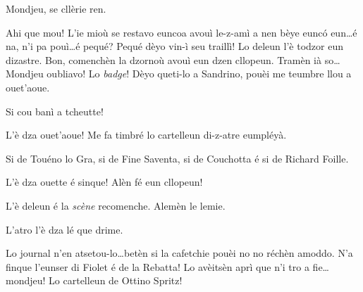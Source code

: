 \begin{drama}
\Spritzspeaks{} Mondjeu,  se cllèrie ren. 

\Spritzspeaks Ahi que mou! L’ie mioù se restavo euncoa avouì le-z-amì a nen bèye eunc\'o eun\ldots é na, n'i pa pouì\ldots é pequé? Pequé dèyo vin-ì seu traillì! Lo deleun l’è todzor eun dizastre. Bon, comenchèn la dzornoù avouì eun dzen cllopeun.  Tramèn ià so\ldots  Mondjeu oubliavo! Lo \textit{badge}! Dèyo queti-lo a Sandrino, pouèi me teumbre llou a ouet'aoue.


\Spritzspeaks Si cou banì a tcheutte!




\Thierryspeaks L'è dza ouet'aoue! Me fa timbré lo cartelleun di-z-atre eumpléyà.


\Thierryspeaks Si de Touéno lo Gra, si de Fine Saventa, si de Couchotta é si de Richard Foille.


\Thierryspeaks L'è dza ouette é sinque! Alèn fé eun cllopeun!


\scene[-- L'è deleun]


\Sandrinospeaks L'è deleun é la \textit{scène} recomenche. Alemèn le lemie.


\Sandrinospeaks{} L'atro l'è dza lé que drime.


\Sandrinospeaks Lo journal n'en atsetou-lo\ldots betèn si la cafetchie pouèi no no réchèn amoddo.  N'a finque l'eunser di Fiolet é de la Rebatta! Lo avèitsèn aprì que n'i tro a fie\ldots mondjeu! Lo cartelleun de Ottino Spritz!


\end{drama}
